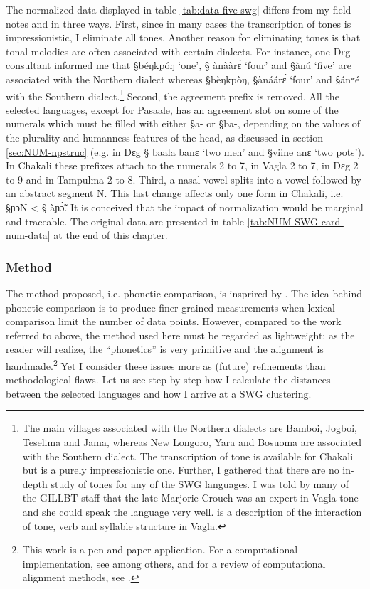 The normalized data displayed in table \ref{tab:data-five-swg} differs from my
field notes and \cite{Chan09} in three ways. First,  since in many cases the
transcription of
tones is  impressionistic, I eliminate all tones. Another reason for
eliminating
tones is that tonal melodies are often associated with certain dialects.  For
instance,  one  Dɛg  consultant informed me  that {\S béŋkpóŋ} `one',  {\S
ànààrɛ̀} `four'  and   {\S ànú} `five' are associated with the Northern
dialect whereas {\S bèŋkpòŋ}, {\S ànáárɛ́} `four'  and   {\S ánʷé} with
the Southern dialect.\footnote{The main villages associated with the Northern
dialects are Bamboi, Jogboi, Teselima and  Jama, whereas New Longoro, Yara and 
Bosuoma  are associated with the Southern dialect. The transcription of tone is
available for
Chakali but is a purely impressionistic one. Further, I
gathered that there are no in-depth study of tones for any  of the SWG
languages.  I was told by many of the GILLBT staff that the late
Marjorie Crouch was an expert in Vagla tone and she could speak  the
language very well.  \cite{Crou85} is a description of the interaction of  tone,
verb and 
syllable structure in Vagla.}  Second,
the agreement prefix is removed. All the
selected languages, except for Pasaale, has an agreement slot on some of the
numerals which must be filled with either {\S a-} or {\S ba-}, depending on the
values of the plurality and humanness features of the head, as discussed
in section \ref{sec:NUM-npstruc} (e.g. in Dɛg {\S
baala banɛ} `two
men'  and {\S viine anɛ}  `two pots').  In Chakali these prefixes
attach to the numerals 2 to 7, in Vagla 2 to 7, in Dɛg 2 to 9 and in Tampulma 2
to 8.  Third,  a nasal vowel splits into a vowel followed by an abstract segment
N. This last change affects only one form in Chakali, i.e.   {\S ɲɔN} <  {\S
àɲɔ̃̀}. It is conceived that the impact of normalization would be marginal and
traceable. The original data are presented in table
\ref{tab:NUM-SWG-card-num-data} at the end of this chapter.





\subsubsection{Method}
\label{sec:NUM-method}

The method  proposed, i.e. phonetic comparison,  is insprired by
\cite{Hegg05, McMa06, Tedl07}. The idea behind phonetic comparison is to produce
finer-grained measurements when lexical comparison limit the number of data
points. However, compared to the work referred to above, the method used
here must be
regarded as lightweight: as the reader will realize, the ``phonetics'' is
very primitive and  the alignment is handmade.\footnote{This work is a
pen-and-paper application. For a computational
implementation, see \cite{Conv96} among others, and for a review of
computational alignment methods, see  \cite{Kond02}.} Yet I consider
these issues more as  (future) refinements than
methodological flaws.  Let us see step by step how I calculate the distances
between the selected languages and how I arrive at a SWG clustering.


